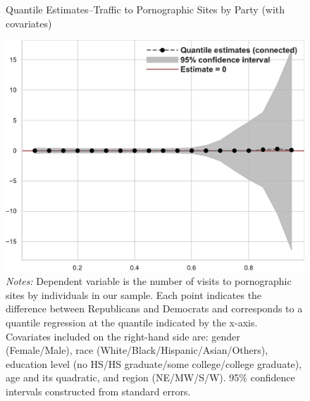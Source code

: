 \documentclass[12pt, letterpaper]{article}
\begin{document}
\begin{figure}
	\centering
	\caption{Quantile Estimates--Traffic to Pornographic Sites by Party (with covariates)}
	\includegraphics[width=.55\linewidth]{../figs/quantile_reg_covariates_visits_adult.pdf}
	\caption*{\footnotesize \emph{Notes:} 
		Dependent variable is the number of visits to pornographic sites by individuals in our sample.
		Each point indicates the difference between Republicans and Democrats and corresponds to a quantile regression at the quantile indicated by the x-axis.
		Covariates included on the right-hand side are: gender (Female/Male), race (White/Black/Hispanic/Asian/Others), education level (no HS/HS graduate/some college/college graduate), age and its quadratic, and region (NE/MW/S/W).
		95\% confidence intervals constructed from standard errors.
	}
	\label{fig:quantile_regression_visits_covariates}
\end{figure}
\end{document}
